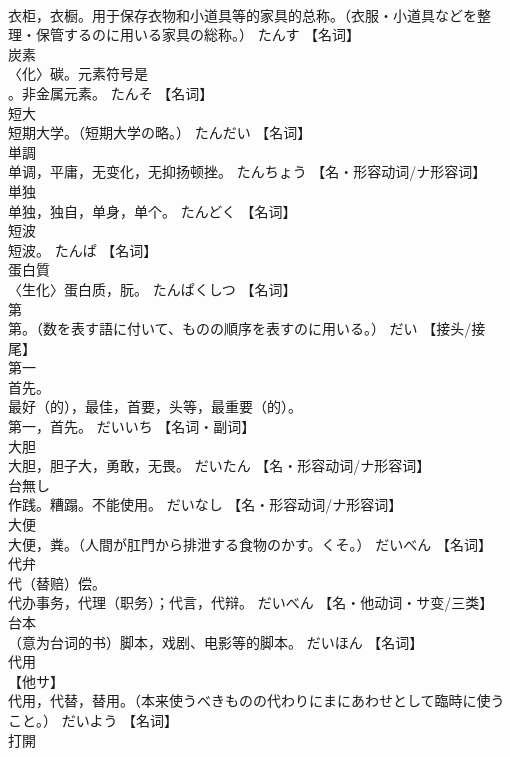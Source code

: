 \documentclass[8pt]{extreport}
\begin{document}
\begin{CJK}{UTF8}{min}
\\	衣柜，衣橱。用于保存衣物和小道具等的家具的总称。（衣服・小道具などを整理・保管するのに用いる家具の総称。）	たんす		【名词】
\\	炭素	
\\	〈化〉碳。元素符号是
\\	。非金属元素。	たんそ		【名词】
\\	短大	
\\	短期大学。（短期大学の略。）	たんだい		【名词】
\\	単調	
\\	单调，平庸，无变化，无抑扬顿挫。	たんちょう		【名・形容动词/ナ形容词】
\\	単独	
\\	单独，独自，单身，单个。	たんどく		【名词】
\\	短波	
\\	短波。	たんぱ		【名词】
\\	蛋白質	
\\	〈生化〉蛋白质，朊。	たんぱくしつ		【名词】
\\	第	
\\	第。（数を表す語に付いて、ものの順序を表すのに用いる。）	だい		【接头/接尾】
\\	第一	
\\	首先。 
\\	最好（的），最佳，首要，头等，最重要（的）。 
\\	第一，首先。	だいいち		【名词・副词】
\\	大胆	
\\	大胆，胆子大，勇敢，无畏。	だいたん		【名・形容动词/ナ形容词】
\\	台無し	
\\	作践。糟蹋。不能使用。	だいなし		【名・形容动词/ナ形容词】
\\	大便	
\\	大便，粪。（人間が肛門から排泄する食物のかす。くそ。）	だいべん		【名词】
\\	代弁	
\\	代（替赔）偿。 
\\	代办事务，代理（职务）；代言，代辩。	だいべん		【名・他动词・サ变/三类】
\\	台本	
\\	（意为台词的书）脚本，戏剧、电影等的脚本。	だいほん		【名词】
\\	代用	
\\	【他サ】 
\\	代用，代替，替用。（本来使うべきものの代わりにまにあわせとして臨時に使うこと。）	だいよう		【名词】
\\	打開	

\end{CJK}
\end{document}
